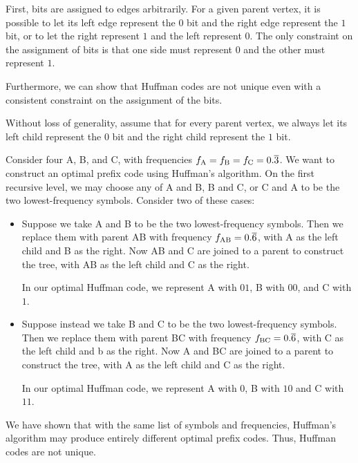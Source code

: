 \begin{enumerate}
\begin{solution}
First, bits are assigned to edges arbitrarily. For a given parent vertex, it is possible to let its left edge represent the $0$ bit and the right edge represent the $1$ bit, or to let the right represent $1$ and the left represent $0$. The only constraint on the assignment of bits is that one side must represent $0$ and the other must represent $1$. 

Furthermore, we can show that Huffman codes are not unique even with a consistent constraint on the assignment of the bits. 

Without loss of generality, assume that for every parent vertex, we always let its left child represent the $0$ bit and the right child represent the $1$ bit.

Consider four A, B, and C, with frequencies $f_{\rm A}=f_{\rm B}=f_{\rm C}=0.\overline{3}$. We want to construct an optimal prefix code using Huffman's algorithm. On the first recursive level, we may choose any of A and B, B and C, or C and A to be the two lowest-frequency symbols. Consider two of these cases:
\begin{itemize}
\item Suppose we take A and B to be the two lowest-frequency symbols. Then we replace them with parent AB with frequency $f_{\rm AB}=0.\overline{6}$, with A as the left child and B as the right. Now AB and C are joined to a parent to construct the tree, with AB as the left child and C as the right.

In our optimal Huffman code, we represent A with $01$, B with $00$, and C with $1$.

\item Suppose instead we take B and C to be the two lowest-frequency symbols. Then we replace them with parent BC with frequency $f_{\rm BC}=0.\overline{6}$, with C as the left child and b as the right. Now A and BC are joined to a parent to construct the tree, with A as the left child and C as the right.

In our optimal Huffman code, we represent A with $0$, B with $10$ and C with $11$.
\end{itemize}
We have shown that with the same list of symbols and frequencies, Huffman's algorithm may produce entirely different optimal prefix codes. Thus, Huffman codes are not unique.
\end{solution}
\end{enumerate}
\newpage
